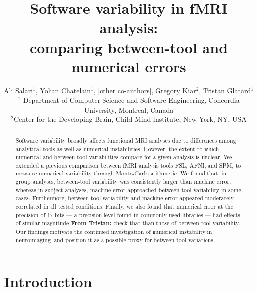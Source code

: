 \documentclass[11pt,onecolumn]{article}
\begin{document}
\newcommand{\fslspm}{FSL-SPM\xspace}
\newcommand{\fslafni}{FSL-AFNI\xspace}
\newcommand{\afnispm}{AFNI-SPM\xspace}
\newcommand{\tristan}[1]{\color{orange}\textbf{From Tristan:} #1\color{black}\xspace}
\newcommand{\ali}[2]{\color{green}\textbf{Ali:} #1\color{black}\xspace}
\newcommand{\discuss}[1]{\uwave{#1}}


\title{Software variability in fMRI analysis:\\ comparing between-tool and numerical errors}

\author{Ali Salari$^1$, Yohan Chatelain$^1$, [other co-authors], Gregory Kiar$^2$, Tristan Glatard$^1$ \\
$^1$ Department of Computer-Science and Software Engineering, Concordia University, Montreal, Canada\\
$^2$Center for the Developing Brain, Child Mind Institute, New York, NY, USA}

\maketitle
\begin{abstract}

Software variability broadly affects functional MRI analyses due to
differences among analytical tools as well as numerical instabilities. However,
the extent to which numerical and between-tool variabilities compare for a
given analysis is unclear. We extended a previous comparison
between fMRI analysis tools FSL, AFNI, and SPM, to measure numerical
variability through Monte-Carlo arithmetic. We found that, in group analyses,
between-tool variability was consistently larger than machine error,
whereas in subject analyses, machine error approached between-tool
variability in some cases. Furthermore, between-tool variability and
machine error appeared moderately correlated in all tested conditions.
Finally, we also found that numerical error at the precision of 17 bits --- a
precision level found in commonly-used libraries --- had effects of similar
magnitude \tristan{check that} than those of between-tool variability. Our findings motivate the
continued investigation of numerical instability in neuroimaging, and position it 
as a possible proxy for between-tool variations.
\end{abstract}

\section{Introduction}
\end{document}
